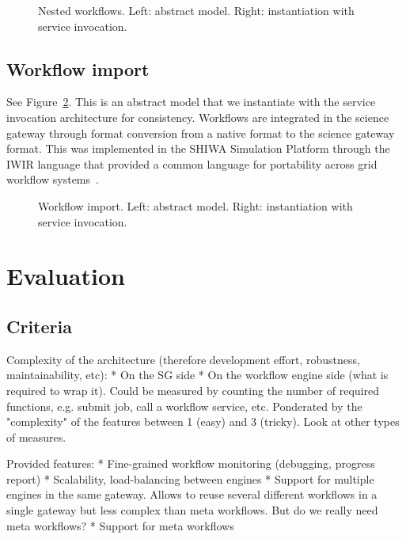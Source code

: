 \documentclass[preprint,3p,twocolumn]{elsarticle}
\begin{document}
\begin{figure}
\centering
\def\svgwidth{0.48\columnwidth}

\def\svgwidth{0.48\columnwidth}

\caption{Nested workflows. Left: abstract model. Right: instantiation with service invocation.}
\label{archi:nested}
\end{figure}

\subsection{Workflow import}

See Figure~\ref{archi:import}. This is an abstract model that we
instantiate with the service invocation architecture for
consistency. Workflows are integrated in the science gateway through
format conversion from a native format to the science gateway
format. This was implemented in the SHIWA Simulation Platform through
the IWIR language that provided a common language for portability
across grid workflow
systems~\cite{plankensteiner-prodan-etal:2013}.

\begin{figure}
\centering
\def\svgwidth{0.48\columnwidth}

\def\svgwidth{0.48\columnwidth}

\caption{Workflow import. Left: abstract model. Right: instantiation with service invocation.}
\label{archi:import}
\end{figure}


\section{Evaluation}

\subsection{Criteria}

Complexity of the architecture (therefore development effort, robustness, maintainability, etc):
  * On the SG side
  * On the workflow engine side (what is required to wrap it).
Could be measured by counting the number of required functions,
e.g. submit job, call a workflow service, etc. Ponderated by the
"complexity" of the features between 1 (easy) and 3 (tricky). Look at
other types of measures.

Provided features:
  * Fine-grained workflow monitoring (debugging, progress report)
  * Scalability, load-balancing between engines
  * Support for multiple engines in the same gateway. Allows to reuse several different workflows in a single gateway but less complex than meta workflows. But do we really need meta workflows?
  * Support for meta workflows
\end{document}
